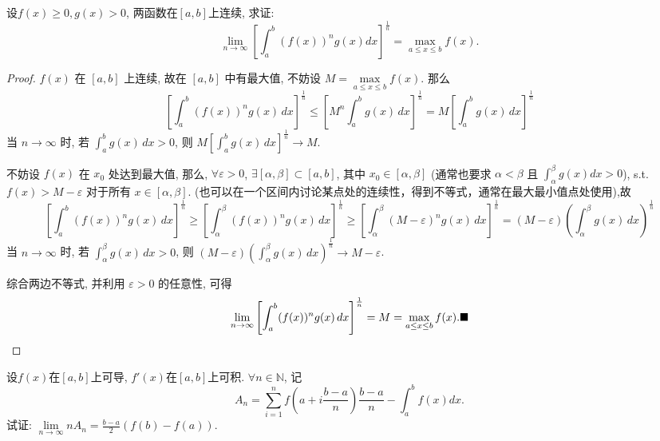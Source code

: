 \documentclass[lang=cn,newtx,10pt,scheme=chinese]{elegantbook}
\begin{document}
\begin{example}[$\bigstar$]
设$f(x) \ge 0, g(x) > 0$, 两函数在$[a,b]$上连续, 求证:
$$ \lim\limits_{n \to \infty} \left[ \int_{a}^{b} (f(x))^n g(x) dx \right]^{\frac{1}{n}} = \max_{a \le x \le b} f(x). $$
\end{example}

\begin{proof}
$f(x)$ 在 $[a,b]$ 上连续, 故在 $[a,b]$ 中有最大值, 不妨设 $M = \max\limits_{a \leq x \leq b} f(x)$.
那么
$$ \left[ \int_a^b (f(x))^n g(x) \,dx \right]^{\frac{1}{n}} \leq \left[ M^n \int_a^b g(x) \,dx \right]^{\frac{1}{n}} = M \left[ \int_a^b g(x) \,dx \right]^{\frac{1}{n}} $$
当 $n \to \infty$ 时, 若 $\int_a^b g(x) \,dx > 0$, 则 $M \left[ \int_a^b g(x) \,dx \right]^{\frac{1}{n}} \to M$.

不妨设 $f(x)$ 在 $x_0$ 处达到最大值, 那么, $\forall \varepsilon > 0$, $\exists [\alpha, \beta] \subset [a,b]$, 其中 $x_0 \in [\alpha, \beta]$ (通常也要求 $\alpha < \beta$ 且 $\int_\alpha^\beta g(x)dx > 0$),
s.t. $f(x) > M-\varepsilon$ 对于所有 $x \in [\alpha, \beta]$. (也可以在一个区间内讨论某点处的连续性，得到不等式，通常在最大最小值点处使用),故
$$ \left[ \int_a^b (f(x))^n g(x) \,dx \right]^{\frac{1}{n}} \geq \left[ \int_{\alpha}^{\beta} (f(x))^n g(x) \,dx \right]^{\frac{1}{n}} \geq \left[ \int_{\alpha}^{\beta} (M-\varepsilon)^n g(x) \,dx \right]^{\frac{1}{n}} = (M-\varepsilon) \left( \int_{\alpha}^{\beta} g(x) \,dx \right)^{\frac{1}{n}} $$
当 $n \to \infty$ 时, 若 $\int_{\alpha}^{\beta} g(x) \,dx > 0$, 则 $(M-\varepsilon) \left( \int_{\alpha}^{\beta} g(x) \,dx \right)^{\frac{1}{n}} \to M-\varepsilon$.

综合两边不等式, 并利用 $\varepsilon > 0$ 的任意性, 可得
$$ \lim\limits_{n \to \infty} \left[ \int_a^b (f(x))^n g(x) \,dx \right]^{\frac{1}{n}} = M = \max\limits_{a \leq x \leq b} f(x). \hfill \blacksquare$$
\end{proof}

\begin{example}[$\bigstar$]\label{eg:4.1.8}
设$f(x)$在$[a,b]$上可导, $f'(x)$在$[a,b]$上可积. $\forall n \in \mathbb{N}$, 记
$$ A_n = \sum_{i=1}^{n} f\left(a+i\frac{b-a}{n}\right)\frac{b-a}{n} - \int_{a}^{b} f(x)dx. $$
试证: $\lim\limits_{n \to \infty} nA_n = \frac{b-a}{2}(f(b)-f(a))$.
\end{example}
\end{document}
